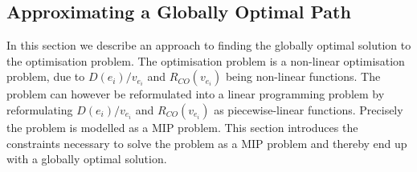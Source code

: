 \subsection{Approximating a Globally Optimal Path}\label{sec:LP}
In this section we describe an approach to finding the globally optimal solution to the optimisation problem. The optimisation problem is a non-linear optimisation problem, due to \( D(e_i)/v_{e_i} \) and $R_{CO}(v_{e_i})$ being non-linear functions. The problem can however be reformulated into a linear programming problem by reformulating \( D(e_i)/v_{e_i} \) and $R_{CO}(v_{e_i})$ as piecewise-linear functions. Precisely the problem is modelled as a MIP problem. This section introduces the constraints necessary to solve the problem as a MIP problem and thereby end up with a globally optimal solution.


